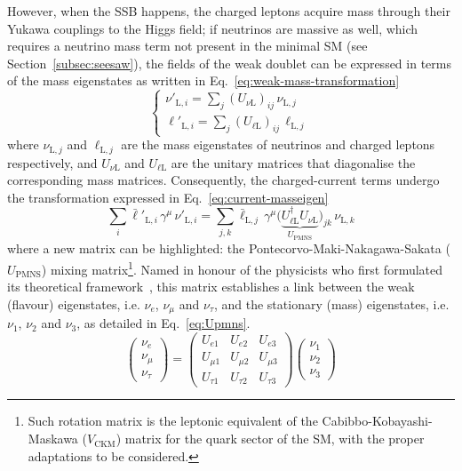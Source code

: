 However, when the \ac{SSB} happens, the charged leptons acquire mass through their Yukawa couplings to the Higgs field; if neutrinos are massive as well, which requires a neutrino mass term not present in the minimal \ac{SM} (see Section~\ref{subsec:seesaw}), the fields of the weak doublet can be expressed in terms of the mass eigenstates as written in Eq.~\ref{eq:weak-mass-transformation}
\begin{equation}
    \label{eq:weak-mass-transformation}
    \begin{cases}
        \nu'_{\text{L}, i} = \sum_{j} \left(U_{\nu \text{L}}\right)_{ij}\, \nu_{\text{L}, j} \\[1ex]
        \ell'_{\text{L}, i} = \sum_{j} \left(U_{\ell \text{L}}\right)_{ij}\, \ell_{\text{L}, j}
    \end{cases}
\end{equation}
where $\nu_{\text{L}, j}$ and $\ell_{\text{L}, j}$ are the mass eigenstates of neutrinos and charged leptons respectively, and $U_{\nu\text{L}}$ and $U_{\ell\text{L}}$ are the unitary matrices that diagonalise the corresponding mass matrices. Consequently, the charged-current terms undergo the transformation expressed in Eq.~\ref{eq:current-masseigen}
\begin{equation}
    \label{eq:current-masseigen}
    \sum_i \bar{\ell}'_{\text{L}, i}\, \gamma^{\mu}\, \nu'_{\text{L}, i}
    = \sum_{j,k} \bar{\ell}_{\text{L}, j}\, \gamma^{\mu}
      \big(\underbrace{U_{\ell \text{L}}^\dagger U_{\nu \text{L}}}_{U_{\text{PMNS}}}\big)_{jk}\,
      \nu_{\text{L}, k}
\end{equation}
where a new matrix can be highlighted: the Pontecorvo-Maki-Nakagawa-Sakata ($U_\text{PMNS}$) mixing matrix\footnote{Such rotation matrix is the leptonic equivalent of the Cabibbo-Kobayashi-Maskawa ($V_\text{CKM}$) matrix for the quark sector of the \ac{SM}, with the proper adaptations to be considered.}. 
Named in honour of the physicists who first formulated its theoretical framework~\cite{Pontecorvo1957, Pontecorvo1967, Maki1962}, 
this matrix establishes a link between the weak (flavour) eigenstates, i.e. $\nu_e$, $\nu_\mu$ and $\nu_\tau$, 
and the stationary (mass) eigenstates, i.e. $\nu_1$, $\nu_2$ and $\nu_3$,
as detailed in Eq.~\ref{eq:Upmns}. 
\begin{equation}
    \label{eq:Upmns}
    \begin{pmatrix}
    \nu_e \\
    \nu_\mu \\
    \nu_\tau
    \end{pmatrix}
    =
    \begin{pmatrix}
    U_{e1} & U_{e2} & U_{e3} \\
    U_{\mu1} & U_{\mu2} & U_{\mu3} \\
    U_{\tau1} & U_{\tau2} & U_{\tau3}
    \end{pmatrix}
    \begin{pmatrix}
    \nu_1 \\
    \nu_2 \\
    \nu_3
\end{pmatrix}
\end{equation}


